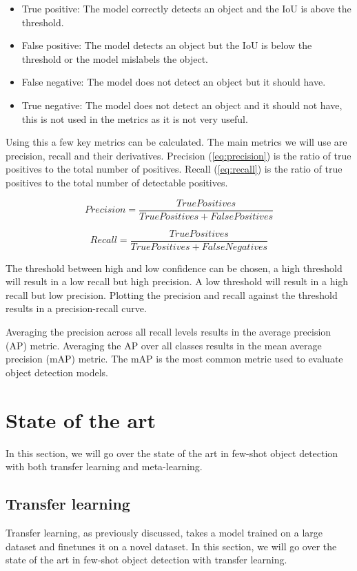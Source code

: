 \begin{itemize}
	\item True positive: The model correctly detects an object and the IoU is above the threshold.
	\item False positive: The model detects an object but the IoU is below the threshold or the model mislabels the object.
	\item False negative: The model does not detect an object but it should have.
	\item True negative: The model does not detect an object and it should not have, this is not used in the metrics as it is not very useful.
\end{itemize}

Using this a few key metrics can be calculated. The main metrics we will use are precision, recall and their derivatives. Precision (\ref{eq:precision}) is the ratio of true positives to the total number of positives. Recall (\ref{eq:recall}) is the ratio of true positives to the total number of detectable positives.



\begin{equation}
	Precision = \frac{TruePositives}{True Positives + False Positives}
	\label{eq:precision}
\end{equation}

\begin{equation}
	Recall = \frac{True Positives}{True Positives + False Negatives}
	\label{eq:recall}
\end{equation}

The threshold between high and low confidence can be chosen, a high threshold will result in a low recall but high precision. A low threshold will result in a high recall but low precision. Plotting the precision and recall against the threshold results in a precision-recall curve.

Averaging the precision across all recall levels results in the average precision (AP) metric. Averaging the AP over all classes results in the mean average precision (mAP) metric. The mAP is the most common metric used to evaluate object detection models.

\section{State of the art}
In this section, we will go over the state of the art in few-shot object detection with both transfer learning and meta-learning.
\subsection{Transfer learning}
Transfer learning, as previously discussed, takes a model trained on a large dataset and finetunes it on a novel dataset. In this section, we will go over the state of the art in few-shot object detection with transfer learning.

